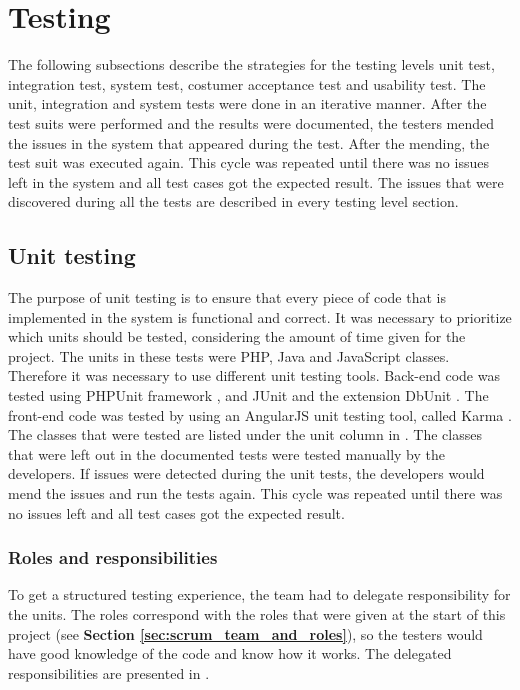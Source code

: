 \chapter{Testing}
\label{chap:testing}

The following subsections describe the strategies for the testing levels unit test, integration test, system test, costumer acceptance test and usability test. 
The unit, integration and system tests were done in an iterative manner. After the test suits were performed and the results were documented, the testers mended the issues in the system that appeared during the test. After the mending, the test suit was executed again. This cycle was repeated until there was no issues left in the system and all test cases got the expected result. The issues that were discovered during all the tests are described in every testing level section. 


\section{Unit testing}
\label{sec:unit_testing}
The purpose of unit testing is to ensure that every piece of code that is implemented in the system is functional and correct. It was necessary to prioritize which units should be tested, considering the amount of time given for the project. 
The units in these tests were PHP, Java and JavaScript classes. Therefore it was necessary to use different unit testing tools. Back-end code was tested using PHPUnit framework \cite{KF2}, and JUnit \cite{jUnit} and the extension DbUnit \cite{dbUnit}. The front-end code was tested by using an AngularJS unit testing tool, called Karma \cite{KF3}. 
The classes that were tested are listed under the unit column in \textbf{}. The classes that were left out in the documented tests were tested manually by the developers. If issues were detected during the unit tests, the developers would mend the issues and run the tests again. This cycle was repeated until there was no issues left and all test cases got the expected result.

\subsection{Roles and responsibilities}
To get a structured testing experience, the team had to delegate responsibility for the units. The roles correspond with the roles that were given at the start of this project (see \textbf{Section \ref{sec:scrum_team_and_roles}}), so the testers would have good knowledge of the code and know how it works. The delegated responsibilities are presented in \textbf{}.



